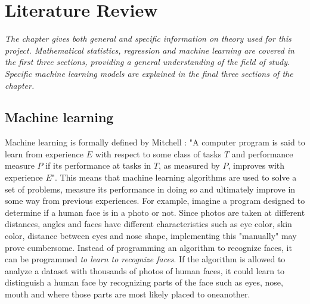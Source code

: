 \chapter{Literature Review}
\emph{The chapter gives both general and specific information on theory used for this project.  Mathematical statistics, regression and machine learning are covered in the first three sections, providing a general understanding of the field of study. Specific machine learning models are explained in the final three sections of the chapter. }


\section{Machine learning}


	
	Machine learning is formally defined by Mitchell \cite{BOOK:2}: 
"A computer program is said to learn from experience $E$ with respect to some class of tasks $T$ and performance measure $P$ if its performance at tasks in $T$, as measured by $P$, improves with experience $E$".	This means that machine learning algorithms are used to solve a set of problems, measure its performance in doing so and ultimately improve in some way from previous experiences. For example, imagine a program designed to determine if a human face is in a photo or not. Since photos are taken at different distances, angles and faces have different characteristics such as eye color, skin color, distance between eyes and nose shape, implementing this "manually" may prove cumbersome. Instead of programming an algorithm to recognize faces, it can be programmed  \emph{to learn to recognize faces}. If the algorithm is allowed to analyze a dataset with thousands of photos of human faces, it could learn to distinguish a human face by recognizing parts of the face such as eyes, nose, mouth and where those parts are most likely placed to oneanother.

